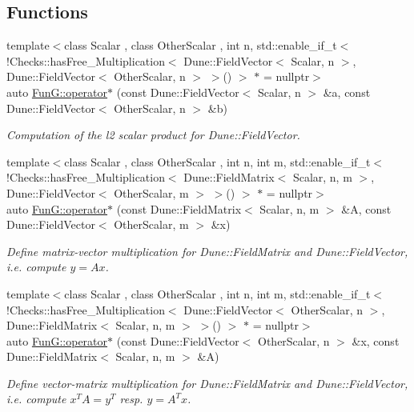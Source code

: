 \subsection*{Functions}
\begin{DoxyCompactItemize}
\item 
{\footnotesize template$<$class Scalar , class Other\+Scalar , int n, std\+::enable\+\_\+if\+\_\+t$<$ !\+Checks\+::has\+Free\+\_\+\+Multiplication$<$ Dune\+::\+Field\+Vector$<$ Scalar, n $>$, Dune\+::\+Field\+Vector$<$ Other\+Scalar, n $>$ $>$() $>$ $\ast$  = nullptr$>$ }\\auto \hyperlink{namespaceFunG_a5e258023361844926f485229c62a733b}{Fun\+G\+::operator$\ast$} (const Dune\+::\+Field\+Vector$<$ Scalar, n $>$ \&a, const Dune\+::\+Field\+Vector$<$ Other\+Scalar, n $>$ \&b)
\begin{DoxyCompactList}\small\item\em Computation of the l2 scalar product for Dune\+::\+Field\+Vector. \end{DoxyCompactList}\item 
{\footnotesize template$<$class Scalar , class Other\+Scalar , int n, int m, std\+::enable\+\_\+if\+\_\+t$<$ !\+Checks\+::has\+Free\+\_\+\+Multiplication$<$ Dune\+::\+Field\+Matrix$<$ Scalar, n, m $>$, Dune\+::\+Field\+Vector$<$ Other\+Scalar, m $>$ $>$() $>$ $\ast$  = nullptr$>$ }\\auto \hyperlink{namespaceFunG_abadb8da34a5abc3dde0107231ab91c6f}{Fun\+G\+::operator$\ast$} (const Dune\+::\+Field\+Matrix$<$ Scalar, n, m $>$ \&A, const Dune\+::\+Field\+Vector$<$ Other\+Scalar, m $>$ \&x)
\begin{DoxyCompactList}\small\item\em Define matrix-\/vector multiplication for Dune\+::\+Field\+Matrix and Dune\+::\+Field\+Vector, i.\+e. compute $y=Ax$. \end{DoxyCompactList}\item 
{\footnotesize template$<$class Scalar , class Other\+Scalar , int n, int m, std\+::enable\+\_\+if\+\_\+t$<$ !\+Checks\+::has\+Free\+\_\+\+Multiplication$<$ Dune\+::\+Field\+Vector$<$ Other\+Scalar, n $>$, Dune\+::\+Field\+Matrix$<$ Scalar, n, m $>$ $>$() $>$ $\ast$  = nullptr$>$ }\\auto \hyperlink{namespaceFunG_a19a9d7b55b56f5101560034413a1dbfe}{Fun\+G\+::operator$\ast$} (const Dune\+::\+Field\+Vector$<$ Other\+Scalar, n $>$ \&x, const Dune\+::\+Field\+Matrix$<$ Scalar, n, m $>$ \&A)
\begin{DoxyCompactList}\small\item\em Define vector-\/matrix multiplication for Dune\+::\+Field\+Matrix and Dune\+::\+Field\+Vector, i.\+e. compute $x^T A = y^T$ resp. $y=A^T x$. \end{DoxyCompactList}\item 

\end{DoxyCompactItemize}
